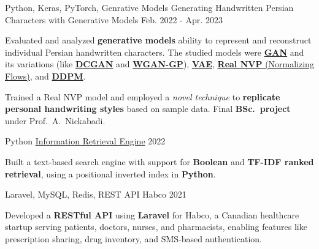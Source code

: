 \begin{cventries}
  \cventry
    {Python, Keras, PyTorch, Genrative Models} %
    {Generating Handwritten Persian Characters with Generative Models} %
    {} %
    {Feb. 2022 - Apr. 2023} %
    {
      \begin{cvitems} %
      	\item {Evaluated and analyzed  \textbf{generative models} ability to represent and reconstruct individual Persian handwritten characters. The studied models were \href{https://arxiv.org/abs/1406.2661}{\textbf{GAN}} and its variations (like \href{https://arxiv.org/abs/1511.06434}{\textbf{DCGAN}} and \href{https://arxiv.org/abs/1704.00028}{\textbf{WGAN-GP}}), \href{https://arxiv.org/abs/1312.6114}{\textbf{VAE}}, \href{https://arxiv.org/abs/1605.08803}{\textbf{Real NVP} (Normalizing Flows)}, and \href{https://arxiv.org/abs/2006.11239}{\textbf{DDPM}}.}
      	\item{Trained a Real NVP model and employed a \textit{novel technique} to \textbf{replicate personal handwriting styles} based on sample data. Final \textbf{BSc.~project} under Prof.~A.~Nickabadi.}
      \end{cvitems}
    }

  \cventry
    {Python} %
    {\href{https://github.com/radinshayanfar/AUT-IR}{Information Retrieval Engine}} %
    {} %
    {2022} %
    {
      \begin{cvitems} %
      	\item {Built a text-based search engine with support for \textbf{Boolean} and \textbf{TF-IDF ranked retrieval}, using a positional inverted index in \textbf{Python}.}
      \end{cvitems}
    }
    
  \cventry
    {Laravel, MySQL, Redis, REST API} %
    {Habco} %
    {} %
    {2021} %
    {
      \begin{cvitems} %
      	\item {Developed a \textbf{RESTful API} using \textbf{Laravel} for Habco, a Canadian healthcare startup serving patients, doctors, nurses, and pharmacists, enabling features like prescription sharing, drug inventory, and SMS-based authentication.}
      \end{cvitems}
    }


\end{cventries}
